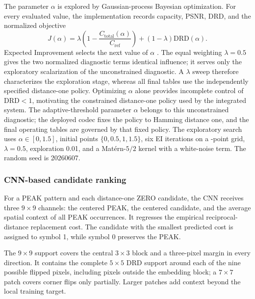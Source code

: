 The parameter $\alpha$ is explored by Gaussian-process Bayesian optimization.
For every evaluated value, the implementation records capacity, PSNR, DRD, and
the normalized objective
\begin{equation}
J(\alpha)=\lambda\left(1-\frac{C_{\text{total}}(\alpha)}{C_{\mathrm{ref}}}\right)
+(1-\lambda)\mathrm{DRD}(\alpha).
\label{eq:gp-objective}
\end{equation}
Expected Improvement selects the next value of $\alpha$
\cite{Frazier2018Bayesian}. The equal weighting
$\lambda=0.5$ gives the two normalized diagnostic terms identical influence;
\RevisionAddBegin
it serves only the exploratory scalarization of the unconstrained diagnostic.
A $\lambda$ sweep therefore characterizes the exploration stage, whereas all
final tables use the independently specified distance-one policy. Optimizing
$\alpha$ alone provides incomplete control of
\RevisionAddEnd
$\mathrm{DRD}<1$, motivating the constrained distance-one policy used by the
\RevisionAddBegin
integrated system. The adaptive-threshold parameter $\alpha$ belongs to this
unconstrained diagnostic; the deployed codec fixes the policy to Hamming
distance one, and the final operating tables are governed by that fixed policy.
The exploratory search uses
\RevisionAddEnd
$\alpha\in[0,1.5]$, initial points $\{0,0.5,1,1.5\}$, six EI iterations on a
-point grid, $\lambda=0.5$, exploration 0.01, and a Mat\'ern-$5/2$ kernel
\RevisionAddEnd
with a white-noise term. The random seed is 20260607.

\subsubsection*{CNN-based candidate ranking}

For a PEAK pattern and each distance-one ZERO candidate, the CNN receives three
\RevisionAddBegin
$9\times9$ channels: the centered PEAK, the centered candidate, and the average
\RevisionAddEnd
spatial context of all PEAK occurrences. It regresses the empirical
reciprocal-distance replacement cost. The candidate with the smallest predicted
\RevisionAddBegin
cost is assigned to symbol 1, while symbol 0 preserves the PEAK.
\RevisionAddEnd

The $9\times9$ support covers the central $3\times3$ block and a three-pixel
margin in every direction. It contains the complete $5\times5$ DRD support
around each of the nine possible flipped pixels, including pixels outside the
\RevisionAddBegin
embedding block; a $7\times7$ patch covers corner flips only partially.
Larger patches add context beyond the local training target.
\RevisionAddEnd

